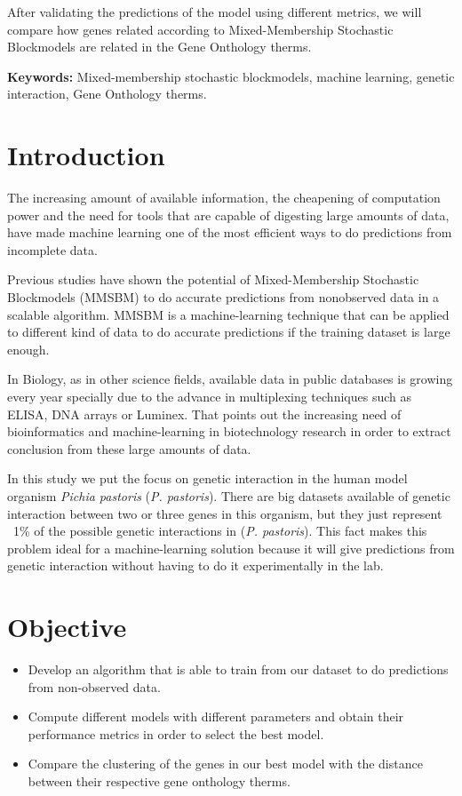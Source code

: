 \documentclass[11pt]{article}
\begin{document}
\par
After validating the predictions of the model using different metrics, we will compare how genes related according to Mixed-Membership Stochastic Blockmodels are related in the Gene Onthology therms.

\par
\textbf{Keywords:} Mixed-membership stochastic blockmodels, machine learning, genetic interaction, Gene Onthology therms.


\section{Introduction}
The increasing amount of available information, the cheapening of computation power and the need for tools that are capable of digesting large amounts of data, have made machine learning one of the most efficient ways to do predictions from incomplete data.

\par 
Previous studies have shown the potential of Mixed-Membership Stochastic Blockmodels (MMSBM) to do accurate predictions from nonobserved data in a scalable algorithm. MMSBM is a machine-learning technique that can be applied to different kind of data to do accurate predictions if the training dataset is large enough. 

\par
In Biology, as in other science fields, available data in public databases is growing every year specially due to the advance in multiplexing techniques such as ELISA, DNA arrays or Luminex. That points out the increasing need of bioinformatics and machine-learning in biotechnology research in order to extract conclusion from these large amounts of data.

\par
In this study we put the focus on genetic interaction in the human model organism \textit{Pichia pastoris} (\textit{P. pastoris}). There are big datasets available of genetic interaction between two or three genes in this organism, but they just represent ~1\% of the possible genetic interactions in (\textit{P. pastoris}). This fact makes this problem ideal for a machine-learning solution because it will give predictions from genetic interaction without having to do it experimentally in the lab. 

\section{Objective}
  \begin{itemize}
    \item Develop an algorithm that is able to train from our dataset to do predictions from non-observed data.
    \item Compute different models with different parameters and obtain their performance metrics in order to select the best model.
    \item Compare the clustering of the genes in our best model with the distance between their respective gene onthology therms.
  \end{itemize}
\end{document}
